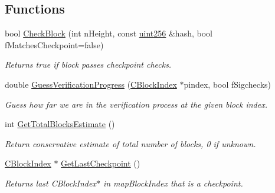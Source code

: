 \subsection*{Functions}
\begin{DoxyCompactItemize}
\item 
\mbox{\label{namespace_checkpoints_a019ce151527c95d42b7ead18f7783f52}} 
bool \mbox{\hyperlink{namespace_checkpoints_a019ce151527c95d42b7ead18f7783f52}{Check\+Block}} (int n\+Height, const \mbox{\hyperlink{classuint256}{uint256}} \&hash, bool f\+Matches\+Checkpoint=false)
\begin{DoxyCompactList}\small\item\em Returns true if block passes checkpoint checks. \end{DoxyCompactList}\item 
\mbox{\label{namespace_checkpoints_ad473e253a3826fec1a7f9394c695ba91}} 
double \mbox{\hyperlink{namespace_checkpoints_ad473e253a3826fec1a7f9394c695ba91}{Guess\+Verification\+Progress}} (\mbox{\hyperlink{class_c_block_index}{C\+Block\+Index}} $\ast$pindex, bool f\+Sigchecks)
\begin{DoxyCompactList}\small\item\em Guess how far we are in the verification process at the given block index. \end{DoxyCompactList}\item 
\mbox{\label{namespace_checkpoints_ac4dc0a0ba00009be52fee3eef694c2c0}} 
int \mbox{\hyperlink{namespace_checkpoints_ac4dc0a0ba00009be52fee3eef694c2c0}{Get\+Total\+Blocks\+Estimate}} ()
\begin{DoxyCompactList}\small\item\em Return conservative estimate of total number of blocks, 0 if unknown. \end{DoxyCompactList}\item 
\mbox{\label{namespace_checkpoints_acd7c59bef29b80f040017d27b76e09a8}} 
\mbox{\hyperlink{class_c_block_index}{C\+Block\+Index}} $\ast$ \mbox{\hyperlink{namespace_checkpoints_acd7c59bef29b80f040017d27b76e09a8}{Get\+Last\+Checkpoint}} ()
\begin{DoxyCompactList}\small\item\em Returns last C\+Block\+Index$\ast$ in map\+Block\+Index that is a checkpoint. \end{DoxyCompactList}\end{DoxyCompactItemize}
